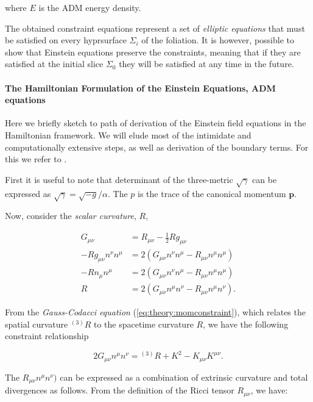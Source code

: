 where $E$ is the ADM energy density.

The obtained constraint equations represent a set of \textit{elliptic equations} that must be satisfied on every hyprsurface $\Sigma_i$ of the foliation. 
It is however, possible to show that Einstein equations preserve the constraints, meaning that if they are satisfied at the initial slice $\Sigma_0$ they will be satisfied at any time in the future.


\paragraph{The Hamiltonian Formulation of the Einstein Equations, ADM equations}




Here we briefly sketch to path of derivation of the Einstein field equations in the Hamiltonian framework. We will elude most of the intimidate and computationally extensive steps, as well as derivation of the boundary terms. For this we refer to \cite{Poisson:2004}.

First it is useful to note that determinant of the three-metric $\sqrt{\gamma}$ can be expressed as $\sqrt{\gamma}=\sqrt{-g}/\alpha$. 
The $p$ is the trace of the canonical momentum $\boldsymbol{p}$.

Now, consider the \textit{scalar curvature}, $R$,

\begin{align}
G_{\mu\nu} &= R_{\mu\nu} - \frac{1}{2}Rg_{\mu\nu} \\
-Rg_{\mu\nu}n^{\nu}n^{\mu} &= 2(G_{\mu\nu} n^{\nu}n^{\mu}-R_{\mu\nu}n^{\mu}n^{\mu})\\
-Rn_{\mu}n^{\mu}& = 2(G_{\mu\nu}n^{\nu}n^{\mu} - R_{\mu\nu}n^{\mu}n^{\mu}) \\
R &= 2(G_{\mu\nu}n^{\mu}n^{\nu} - R_{\mu\nu}n^{\mu}n^{\nu}).
\end{align}

From the \textit{Gauss-Codacci equation} (\ref{eq:theory:momconstraint}), which relates the spatial curvature $^{(3)}R$ to the spacetime curvature $R$, we have the following constraint relationship

\begin{equation}
2G_{\mu\nu}n^{\mu}n^{\nu} = {^{(3)}R} + K^2 - K_{\mu\nu}K^{\mu\nu}.
\end{equation}

The $R_{\mu\nu}n^{\mu}n^{\nu})$ can be expressed as a combination of extrinsic curvature and total divergences as follows.
From the definition of the Ricci tensor $R_{\mu\nu}$, we have:

